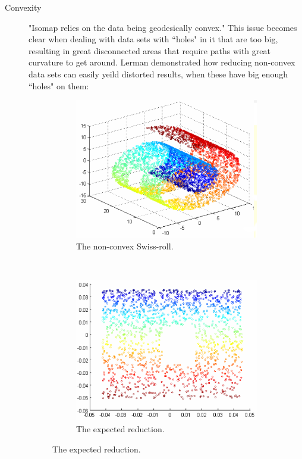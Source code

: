 \documentclass[12pt]{article}
\begin{document}
\begin{description}
	\newpage
	\item[Convexity] "Isomap relies on the data being geodesically convex." \cite{donoho2002does} This issue becomes clear when dealing with data sets with ``holes" in it that are too big, resulting in great disconnected areas that require paths with great curvature to get around. Lerman demonstrated how reducing non-convex data sets can easily yeild distorted results, when these have big enough ``holes" on them: \cite{lerman2005}
	\begin{figure}[H]
		\centering
		\begin{subfigure}[H]{.45\linewidth}
			\includegraphics[width=\linewidth]{img/convexity/original.png}
			\captionsetup{justification=centering}
			\caption{The non-convex Swiss-roll.}
		\end{subfigure}
		~
		\begin{subfigure}[H]{.45\linewidth}
			\includegraphics[width=\linewidth]{img/convexity/expected.png}
			\captionsetup{justification=centering}
			\caption{The expected reduction.}
		\end{subfigure}
		\newline\newline
		

\end{figure}
\end{description}
\end{document}

